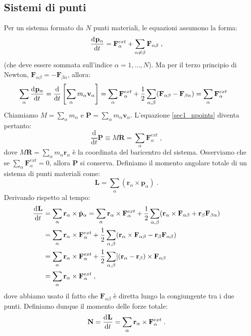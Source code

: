 \subsection*{Sistemi di punti}
Per un sistema formato da $N$ punti materiali, le equazioni assumono la forma:
\begin{equation}
\frac{\mathrm{d}^{}\mathbf{p}_{\alpha}}{\mathrm{d}t^{}}=\mathbf{F}_{\alpha}^{ext}+\sum_{\alpha\ne\beta}\mathbf{F}_{\alpha\beta}\;, 
\end{equation}
(che deve essere sommata sull'indice $\alpha=1,\ldots,N$). Ma per il terzo principio di Newton, $\mathbf{F}_{\alpha\beta}=-\mathbf{F}_{\beta\alpha}$, allora:
\begin{align}
\sum_{\alpha}\frac{\mathrm{d}^{}\mathbf{p}_{\alpha}}{\mathrm{d}t^{}}&=\frac{\mathrm{d}}{\mathrm{d}t} \left[\sum_{\alpha}m_{\alpha}\mathbf{v}_{\alpha}\right]=
\sum_{\alpha}\mathbf{F}_{\alpha}^{ext}+\frac{1}{2}\sum_{\alpha,\beta}(\mathbf{F}_{\alpha\beta}-\mathbf{F}_{\beta\alpha})= \sum_{\alpha} \mathbf{F}_{\alpha}^{ext} \label{sec1_npoints}
\end{align}
Chiamiamo $M=\sum_{\alpha} m_{\alpha}$ e $\mathbf{P}=\sum_{\alpha} m_{\alpha}\mathbf{v}_{\alpha}$. L'equazione \eqref{sec1_npoints} diventa pertanto:
\begin{equation}
\frac{\mathrm{d}}{\mathrm{d}t}\mathbf{P}\equiv M\ddot{\mathbf{R}}=\sum_{\alpha} \mathbf{F}_{\alpha}^{ext}\;,
\end{equation}
dove $M\mathbf{R}=\sum_{\alpha}m_{\alpha}\mathbf{r}_{\alpha}$ è la coordinata del baricentro del sistema. Osserviamo che se $\sum_{\alpha} \mathbf{F}_{\alpha}^{ext}=0$, allora $\mathbf{P}$ si conserva. Definiamo il momento angolare totale di un sistema di punti materiali come:
\begin{equation}
\mathbf{L}=\sum_{\alpha}(\mathbf{r}_{\alpha}\times \mathbf{p}_{\alpha})\;.
\end{equation}
Derivando rispetto al tempo:
\begin{align}
\frac{\mathrm{d}^{}\mathbf{L}}{\mathrm{d}t^{}}&=\sum_{\alpha} \mathbf{r}_{\alpha}\times \dot{\mathbf{p}}_{\alpha}=\sum_{\alpha} \mathbf{r}_{\alpha}\times \mathbf{F}_{\alpha}^{ext}+\frac{1}{2}\sum_{\alpha,\beta}(\mathbf{r}_{\alpha}\times \mathbf{F}_{\alpha\beta}+\mathbf{r}_{\beta}\mathbf{F}_{\beta\alpha}) \notag \\
&= \sum_{\alpha} \mathbf{r}_{\alpha}\times \mathbf{F}_{\alpha}^{ext}+\frac{1}{2}\sum_{\alpha,\beta} (\mathbf{r}_{\alpha}\times\mathbf{F}_{\alpha\beta}-\mathbf{r}_{\beta}\mathbf{F}_{\alpha\beta}) \notag \\
&=\sum_{\alpha} \mathbf{r}_{\alpha}\times \mathbf{F}_{\alpha}^{ext}+\frac{1}{2}\sum_{\alpha,\beta} [( \mathbf{r}_{\alpha}-\mathbf{r}_{\beta})\times \mathbf{F}_{\alpha\beta} \notag \\
&= \sum_{\alpha} \mathbf{r}_{\alpha}\times \mathbf{F}_{\alpha}^{ext}\;,
\end{align}
dove abbiamo usato il fatto che $\mathbf{F}_{\alpha\beta}$ è diretta lungo la congiungente tra i due punti. Definiamo dunque il momento delle forze totale:
\begin{equation}
\mathbf{N}=\frac{\mathrm{d}^{}\mathbf{L}}{\mathrm{d}t^{}}=\sum_{\alpha} \mathbf{r}_{\alpha}\times \mathbf{F}_{\alpha}^{ext}\;.
\end{equation}
\pagebreak
